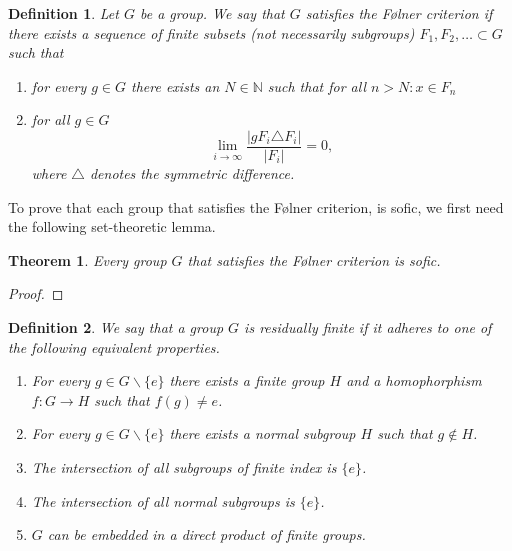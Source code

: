 \documentclass[a4paper]{report}
\newcommand{\N}{\mathbb{N}}
\newcommand{\card}[1]{\left| #1 \right|}
\newtheorem{theorem}{Theorem}
\newtheorem{definition}{Definition}
\begin{document}
    \begin{definition}\cite{noauthor_folner_2019} \label{def:folner}
        Let $G$ be a group. We say that $G$ satisfies the Følner criterion if there exists a sequence of finite subsets (not necessarily subgroups) $F_1, F_2, \dots \subset G$ such that 
        \begin{enumerate}
            \item for every $g \in G$ there exists an $N \in \N$ such that for all $n > N: x \in F_n$
            \item for all $g \in G$ 
            $$\lim_{i\to \infty} \frac{\card{gF_i \triangle F_i}}{\card{F_i}} = 0, $$
            where $\triangle$ denotes the symmetric difference.
        \end{enumerate}
    \end{definition}

To prove that each group that satisfies the Følner criterion, is sofic, we first need the following set-theoretic lemma.


 	\begin{theorem}
        Every group $G$ that satisfies the Følner criterion is sofic.
    \end{theorem}
    \begin{proof}
        
 	\end{proof}

\begin{definition}\cite{noauthor_residually_2018} \label{def:res_fin}
       We say that a group $G$ is residually finite if it adheres to one of the following equivalent properties.
        \begin{enumerate}
            \item For every $g \in G\backslash\{e\}$ there exists a finite group $H$ and a homophorphism $f:G \to H$ such that $f(g) \ne e$.
            \item For every $g \in G\backslash\{e\}$ there exists a normal subgroup $H$ such that $g \notin H$.
            \item The intersection of all subgroups of finite index is $\{e\}$.
            \item The intersection of all normal subgroups is $\{e\}$.
            \item $G$ can be embedded in a direct product of finite groups.
        \end{enumerate}
    \end{definition}

\end{document}
